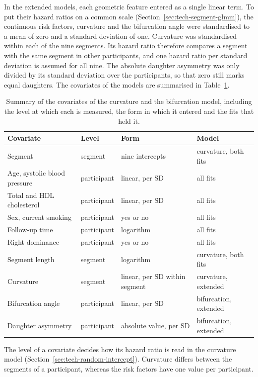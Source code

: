 In the extended models, each geometric feature entered as a single linear term.
To put their hazard ratios on a common scale (Section~\ref{sec:tech-segment-glmm}), the continuous risk factors, curvature and the bifurcation angle were standardised to a mean of zero and a standard deviation of one.
Curvature was standardised within each of the nine segments.
Its hazard ratio therefore compares a segment with the same segment in other participants, and one hazard ratio per standard deviation is assumed for all nine.
The absolute daughter asymmetry was only divided by its standard deviation over the participants, so that zero still marks equal daughters.
The covariates of the models are summarised in Table~\ref{tab:method-covariates}.

\begin{table}[htbp]
  \centering
  \caption{Summary of the covariates of the curvature and the bifurcation model, including the level at which each is measured, the form in which it entered and the fits that held it.}
  \label{tab:method-covariates}
  \begin{tabular}{llll}
    \toprule
    Covariate & Level & Form & Model \\
    \midrule
    Segment & segment & nine intercepts & curvature, both fits \\
    Age, systolic blood pressure & participant & linear, per SD & all fits \\
    Total and HDL cholesterol & participant & linear, per SD & all fits \\
    Sex, current smoking & participant & yes or no & all fits \\
    Follow-up time & participant & logarithm & all fits \\
    Right dominance & participant & yes or no & all fits \\
    Segment length & segment & logarithm & curvature, both fits \\
    Curvature & segment & linear, per SD within segment & curvature, extended \\
    Bifurcation angle & participant & linear, per SD & bifurcation, extended \\
    Daughter asymmetry & participant & absolute value, per SD & bifurcation, extended \\
    \bottomrule
  \end{tabular}
\end{table}

The level of a covariate decides how its hazard ratio is read in the curvature model (Section~\ref{sec:tech-random-intercept}).
Curvature differs between the segments of a participant, whereas the risk factors have one value per participant.

